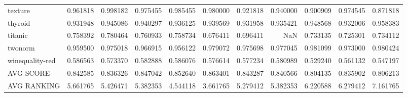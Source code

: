 \begin{tabular}{lrrrrrrrrrr}
texture         &   0.961818 &  0.998182 &  0.975455 &  0.985455 &  0.980000 &  0.921818 &  0.940000 &  0.900909 &  0.974545 &  0.871818 \\
thyroid         &   0.931948 &  0.945086 &  0.940297 &  0.936125 &  0.939569 &  0.931958 &  0.935421 &  0.948568 &  0.932006 &  0.958383 \\
titanic         &   0.758392 &  0.780464 &  0.760933 &  0.758734 &  0.676411 &  0.696411 &       NaN &  0.733135 &  0.725301 &  0.734112 \\
twonorm         &   0.959500 &  0.975018 &  0.966915 &  0.956122 &  0.979072 &  0.975698 &  0.977045 &  0.981099 &  0.973000 &  0.980424 \\
winequality-red &   0.586563 &  0.573370 &  0.582888 &  0.586076 &  0.576614 &  0.577234 &  0.580989 &  0.529240 &  0.561132 &  0.547197 \\
AVG SCORE       &   0.842585 &  0.836326 &  0.847042 &  0.852640 &  0.863401 &  0.843287 &  0.840566 &  0.804135 &  0.835902 &  0.806213 \\
AVG RANKING     &   5.661765 &  5.426471 &  5.382353 &  4.544118 &  3.661765 &  5.279412 &  5.382353 &  6.220588 &  6.279412 &  7.161765 \\
\bottomrule
\end{tabular}

